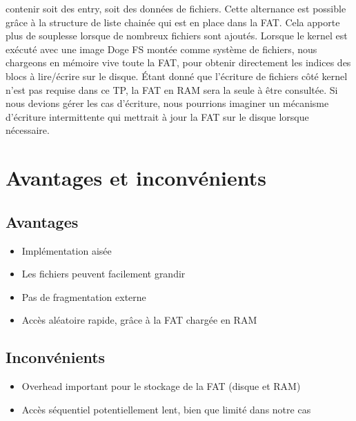 \documentclass[a4paper, 12pt]{article}
\begin{document}
contenir soit des entry, soit des données de fichiers. Cette alternance est possible grâce à la structure 
de liste chainée qui est en place dans la FAT. Cela apporte plus de souplesse lorsque de nombreux fichiers 
sont ajoutés.
\bigbreak
Lorsque le kernel est exécuté avec une image Doge FS montée comme système de fichiers, nous chargeons en 
mémoire vive toute la FAT, pour obtenir directement les indices des blocs à lire/écrire sur le disque. Étant 
donné que l'écriture de fichiers côté kernel n'est pas requise dans ce TP, la FAT en RAM sera la seule à être 
consultée. Si nous devions gérer les cas d'écriture, nous pourrions imaginer un mécanisme d'écriture intermittente
qui mettrait à jour la FAT sur le disque lorsque nécessaire.


\newpage
\section{Avantages et inconvénients}
\subsection{Avantages}
\begin{itemize}
	\item Implémentation aisée
	\item Les fichiers peuvent facilement grandir
	\item Pas de fragmentation externe
	\item Accès aléatoire rapide, grâce à la FAT chargée en RAM
\end{itemize}
\subsection{Inconvénients}
\begin{itemize}
	\item Overhead important pour le stockage de la FAT (disque et RAM)
	\item Accès séquentiel potentiellement lent, bien que limité dans notre cas
\end{itemize}
\end{document}
